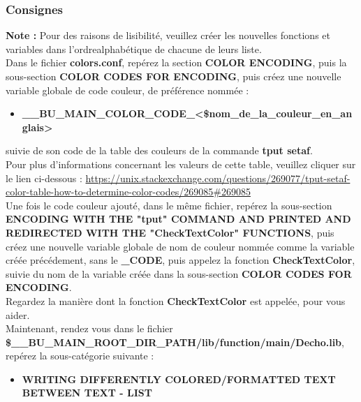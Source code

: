 \documentclass[a4paper,10pt]{article}
\begin{document}
\color{blue}
\subsubsection{Consignes}\color{white}
\textbf{Note :} Pour des raisons de lisibilité, veuillez créer les nouvelles fonctions et variables dans l'ordre\linebreak alphabétique de chacune de leurs liste.\\[1\baselineskip]

Dans le fichier \textbf{\color{lime}colors.conf}, repérez la section \textbf{COLOR ENCODING}, puis la sous-section \textbf{COLOR CODES FOR ENCODING}, puis créez une nouvelle variable globale de code couleur, de préférence nommée :
\begin{itemize}
    \item \textbf{\color{orange}\_\_BU\_MAIN\_COLOR\_CODE\_<\$nom\_de\_la\_couleur\_en\_anglais>}\\[1\baselineskip]
\end{itemize}
 suivie de son code de la table des couleurs de la commande \textbf{\color{gray}tput setaf}.\\[1\baselineskip]

Pour plus d'informations concernant les valeurs de cette table, veuillez cliquer sur le lien ci-dessous :\linebreak
\url{https://unix.stackexchange.com/questions/269077/tput-setaf-color-table-how-to-determine-color-codes/269085#269085}\\[1\baselineskip]

Une fois le code couleur ajouté, dans le même fichier, repérez la sous-section \textbf{ENCODING WITH THE "tput" COMMAND AND PRINTED AND REDIRECTED WITH THE "CheckTextColor" FUNCTIONS}, puis créez une nouvelle variable globale de nom de couleur nommée comme la variable créée précédement, sans le \textbf{\color{orange}\_CODE}, puis appelez la fonction \textbf{\color{mauve}CheckTextColor}, suivie du nom de la variable créée dans la sous-section \textbf{COLOR CODES FOR ENCODING}.\\[1\baselineskip]

Regardez la manière dont la fonction \textbf{\color{mauve}CheckTextColor} est appelée, pour vous aider.\\[2\baselineskip]


Maintenant, rendez vous dans le fichier \textbf{\color{orange}\$\_\_BU\_MAIN\_ROOT\_DIR\_PATH\color{lime}/lib/function/main/Decho.lib}, repérez la sous-catégorie suivante : 
\begin{itemize}
    \item \textbf{WRITING DIFFERENTLY COLORED/FORMATTED TEXT BETWEEN TEXT - LIST}\\[1\baselineskip]
\end{itemize}
\end{document}
